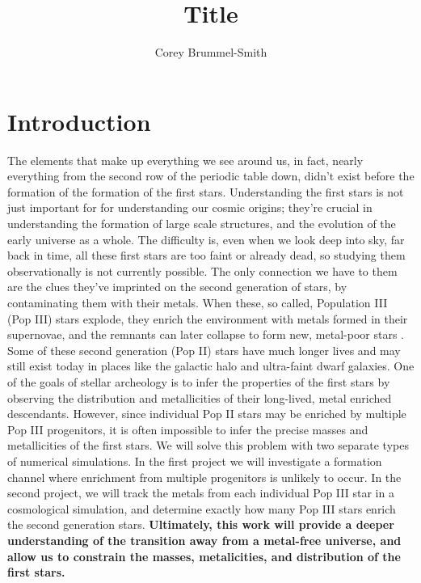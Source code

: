 \documentclass[12pt]{article}
\begin{document}
\fontsize{12}{16}\selectfont
\author{Corey Brummel-Smith}
\title{Title}



\section{Introduction}

The elements that make up everything we see around us, in fact, nearly everything from the second row of the periodic table down, didn't exist before the formation of the formation of the first stars. Understanding the first stars is not just important for for understanding our cosmic origins; they're crucial in understanding the formation of large scale structures, and the evolution of the early universe as a whole. The difficulty is, even when we look deep into sky, far back in time, all these first stars are too faint or already dead, so studying them observationally is not currently possible. The only connection we have to them are the clues they've imprinted on the second generation of stars, by contaminating them with their metals. When these, so called, Population III (Pop III) stars explode, they enrich the environment with metals formed in their supernovae, and the remnants can later collapse to form new, metal-poor stars \cite{...}. Some of these second generation (Pop II) stars have much longer lives and may still exist today in places like the galactic halo and ultra-faint dwarf galaxies. One of the goals of stellar archeology is to infer the properties of the first stars by observing the distribution and metallicities of their long-lived, metal enriched descendants. However, since individual Pop II stars may be enriched by multiple Pop III progenitors, it is often impossible to infer the precise masses and metallicities of the first stars. We will solve this problem with two separate types of numerical simulations. In the first project we will investigate a formation channel where enrichment from multiple progenitors is unlikely to occur. In the second project, we will track the metals from each individual Pop III star in a cosmological simulation, and determine exactly how many Pop III stars enrich the second generation stars. \textbf{Ultimately, this work will provide a deeper understanding of the transition away from a metal-free universe, and allow us to constrain the masses, metalicities, and distribution of the first stars.}
\end{document}
